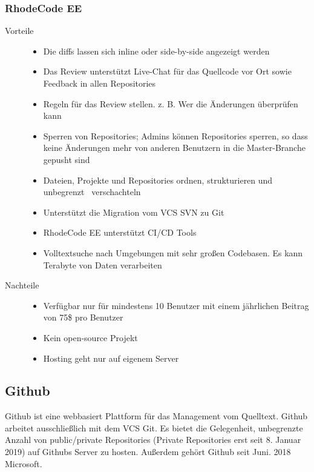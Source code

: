 \subsubsection{RhodeCode EE}
\label{subsubsec:RhodeCode EE}

\begin{description}
	\item [Vorteile] \hfill
		\begin{itemize}
			\item Die diffs lassen sich inline oder side-by-side angezeigt werden
			\item Das Review unterstützt Live-Chat für das Quellcode vor Ort sowie Feedback in allen Repositories
			\item Regeln für das Review stellen. z. B. Wer die Änderungen überprüfen kann
			\item Sperren von Repositories; Admins können Repositories sperren, so dass keine Änderungen mehr von anderen Benutzern in die Master-Branche gepusht sind
			\item Dateien, Projekte und Repositories ordnen, strukturieren und unbegrenzt \, verschachteln
			\item Unterstützt die Migration vom \ac{VCS} \ac{SVN} zu Git
			\item RhodeCode EE unterstützt \ac{CI}/\ac{CD} Tools
			\item Volltextsuche nach Umgebungen mit sehr großen Codebasen. Es kann Terabyte von Daten verarbeiten
		\end{itemize}
		
	\item [Nachteile] \hfill
		\begin{itemize}
			\item Verfügbar nur für mindestens 10 Benutzer mit einem jährlichen Beitrag von 75\$ pro Benutzer
			\item Kein open-source Projekt
			\item Hosting geht nur auf eigenem Server
		\end{itemize}
		
\end{description}

\subsection{Github}
\label{subsec:Github}

Github ist eine webbasiert Plattform für das Management vom Quelltext. Github arbeitet ausschließlich mit dem \ac{VCS} Git. Es bietet die Gelegenheit, unbegrenzte Anzahl von public/private Repositories (Private Repositories erst seit 8. Januar 2019) auf Githubs Server zu hosten. Außerdem gehört Github seit Juni. 2018 Microsoft.

